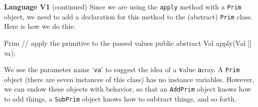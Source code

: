 \begin{minipage}[t]{\sw}
\slidenumber
\LARGE
{\bf Language V1} (continued)\exx
Since we are using the \verb'apply' method with a \verb'Prim' object,
we need to add a declaration for this method
to the (abstract) \verb'Prim' class.
Here is how we do this:
{\Large
\begin{qv}
Prim
    // apply the primitive to the passed values
    public abstract Val apply(Val [] va);
\end{qv}
}
We use the parameter name `\verb'va''
to suggest the idea of a {\bf v}alue {\bf a}rray.\exx
A \verb'Prim' object (there are seven instances of this class)
has no instance variables.
However, we can endow these objects with behavior,
so that an \verb'AddPrim' object knows how to add things,
a \verb'SubPrim' object knows how to subtract things,
and so forth.\exx
\end{minipage}
\clearpage
